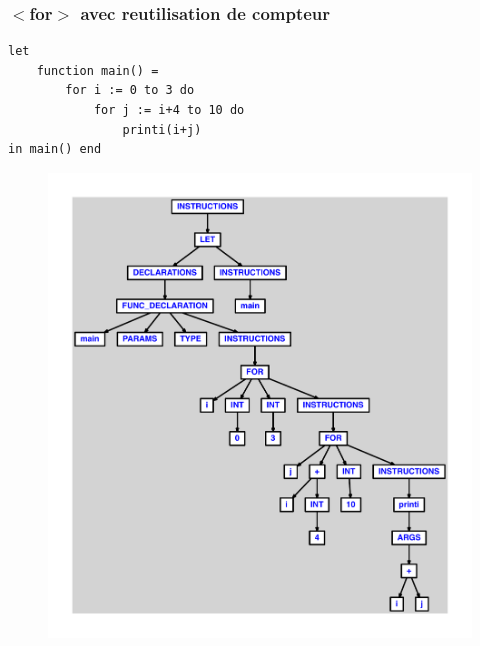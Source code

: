 \documentclass{article}
\begin{document}
\subsubsection{$ < $for$ > $ avec reutilisation de compteur}
\begin{lstlisting}
let
	function main() =
		for i := 0 to 3 do
			for j := i+4 to 10 do
				printi(i+j)
in main() end
\end{lstlisting}
\newpage
\begin{figure}[H]
\centering
\includegraphics[max width=\textwidth]{ast/ast_211.pdf}
\end{figure}
\newpage
\end{document}
